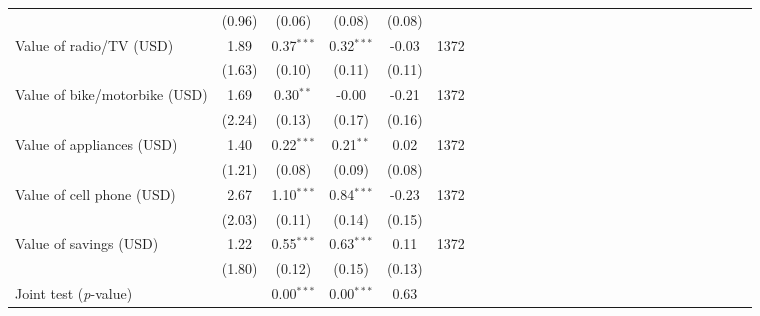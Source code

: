 {\begin{tabular}{l*{5}{SSSSc}}
          &   (0.96)&   (0.06)&   (0.08)&   (0.08)&         \\
\hspace{0.2cm}Value of radio/TV (USD)&     1.89&0.37$^{***}$&0.32$^{***}$&    -0.03&     1372\\
          &   (1.63)&   (0.10)&   (0.11)&   (0.11)&         \\
\hspace{0.2cm}Value of bike/motorbike (USD)&     1.69&0.30$^{**}$&    -0.00&    -0.21&     1372\\
          &   (2.24)&   (0.13)&   (0.17)&   (0.16)&         \\
\hspace{0.2cm}Value of appliances (USD)&     1.40&0.22$^{***}$&0.21$^{**}$&     0.02&     1372\\
          &   (1.21)&   (0.08)&   (0.09)&   (0.08)&         \\
\hspace{0.2cm}Value of cell phone (USD)&     2.67&1.10$^{***}$&0.84$^{***}$&    -0.23&     1372\\
          &   (2.03)&   (0.11)&   (0.14)&   (0.15)&         \\
Value of savings (USD)&     1.22&0.55$^{***}$&0.63$^{***}$&     0.11&     1372\\
          &   (1.80)&   (0.12)&   (0.15)&   (0.13)&         \\
\midrule Joint test (\emph{p}-value)&         &{0.00$^{***}$}&{0.00$^{***}$}&   {0.63}&         \\
\bottomrule
\end{tabular}
}
